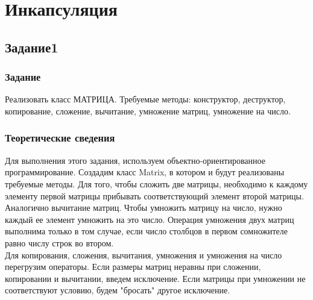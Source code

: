 \documentclass[12pt,a4paper]{report}
\begin{document}
\chapter{Инкапсуляция}
\section{Задание1}
\subsection{Задание}
Реализовать класс МАТРИЦА. Требуемые методы: конструктор, деструктор, копирование, сложение, вычитание, умножение матриц, умножение на число. 

\subsection{Теоретические сведения}
Для выполнения этого задания, используем объектно-ориентированное программирование. Создадим класс Matrix, в котором и будут реализованы требуемые методы. Для того, чтобы сложить две матрицы, необходимо к каждому элементу первой матрицы прибывать соответствующий элемент второй матрицы. Аналогично вычитание матриц. Чтобы умножить матрицу на число, нужно каждый ее элемент умножить на это число. Операция умножения двух матриц выполнима только в том случае, если число столбцов в первом сомножителе равно числу строк во втором. \\
Для копирования, сложения, вычитания, умножения и умножения на число перегрузим операторы. Если размеры матриц неравны при сложении, копировании и вычитании, введем исключение. Если матрицы при умножении не соответствуют условию, будем "бросать" другое исключение. 
\end{document}
